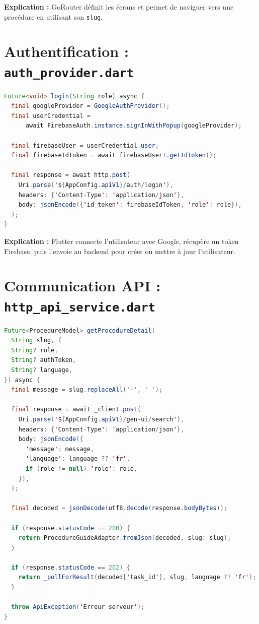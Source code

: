 \documentclass[12pt,a4paper]{report}
\begin{document}
\textbf{Explication :} GoRouter définit les écrans et permet de naviguer vers une procédure en utilisant son \texttt{slug}.

\section{Authentification : \texttt{auth\_provider.dart}}

\begin{lstlisting}[language=Java,caption={Connexion Google et backend}]
Future<void> login(String role) async {
  final googleProvider = GoogleAuthProvider();
  final userCredential =
      await FirebaseAuth.instance.signInWithPopup(googleProvider);

  final firebaseUser = userCredential.user;
  final firebaseIdToken = await firebaseUser!.getIdToken();

  final response = await http.post(
    Uri.parse('${AppConfig.apiV1}/auth/login'),
    headers: {'Content-Type': 'application/json'},
    body: jsonEncode({'id_token': firebaseIdToken, 'role': role}),
  );
}
\end{lstlisting}

\textbf{Explication :} Flutter connecte l'utilisateur avec Google, récupère un token Firebase, puis l'envoie au backend pour créer ou mettre à jour l'utilisateur.

\section{Communication API : \texttt{http\_api\_service.dart}}

\begin{lstlisting}[language=Java,caption={Appel GenUI depuis Flutter}]
Future<ProcedureModel> getProcedureDetail(
  String slug, {
  String? role,
  String? authToken,
  String? language,
}) async {
  final message = slug.replaceAll('-', ' ');

  final response = await _client.post(
    Uri.parse('${AppConfig.apiV1}/gen-ui/search'),
    headers: {'Content-Type': 'application/json'},
    body: jsonEncode({
      'message': message,
      'language': language ?? 'fr',
      if (role != null) 'role': role,
    }),
  );

  final decoded = jsonDecode(utf8.decode(response.bodyBytes));

  if (response.statusCode == 200) {
    return ProcedureGuideAdapter.fromJson(decoded, slug: slug);
  }

  if (response.statusCode == 202) {
    return _pollForResult(decoded['task_id'], slug, language ?? 'fr');
  }

  throw ApiException('Erreur serveur');
}
\end{lstlisting}
\end{document}
